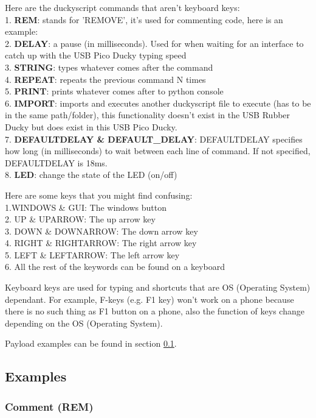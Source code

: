 \documentclass[a4paper,12pt]{article}
\begin{document}
Here are the duckyscript commands that aren't keyboard keys:
\\1. \textbf{REM}: stands for 'REMOVE', it's used for commenting code, here is an example:
\\2. \textbf{DELAY}: a pause (in milliseconds). Used for when waiting for an interface to catch up with the USB Pico Ducky typing speed
\\3. \textbf{STRING}: types whatever comes after the command
\\4. \textbf{REPEAT}: repeats the previous command N times
\\5. \textbf{PRINT}: prints whatever comes after to python console
\\6. \textbf{IMPORT}: imports and executes another duckyscript file to execute (has to be in the same path/folder), this functionality doesn't exist in the USB Rubber Ducky but does exist in this USB Pico Ducky.
\\7. \textbf{DEFAULTDELAY \& DEFAULT\_DELAY}:  DEFAULTDELAY specifies how long (in milliseconds) to wait between each line of command. If not specified, DEFAULTDELAY is 18ms.
\\8. \textbf{LED}: change the state of the LED (on/off)

Here are some keys that you might find confusing:
\\1.WINDOWS \& GUI: The windows button
\\2. UP \& UPARROW: The up arrow key
\\3. DOWN \& DOWNARROW: The down arrow key
\\4. RIGHT \& RIGHTARROW: The right arrow key
\\5. LEFT \& LEFTARROW: The left arrow key
\\6. All the rest of the keywords can be found on a keyboard

Keyboard keys are used for typing and shortcuts that are OS (Operating System) dependant. For example, F-keys (e.g. F1 key) won't work on a phone because there is no such thing as F1 button on a phone, also the function of keys change depending on the OS (Operating System).

Payload examples can be found in section \ref{duckyscript_examples}.

\subsection{Examples}\label{duckyscript_examples}

\subsubsection{Comment (REM)}
\end{document}
